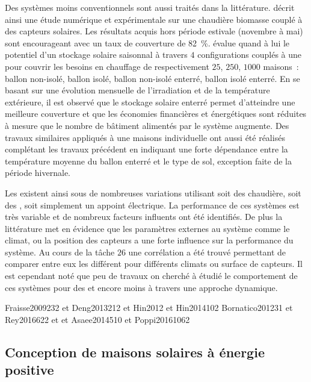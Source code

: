 Des systèmes moins conventionnels sont aussi traités dans la littérature.
\textcite{Hartl2012623} décrit ainsi une étude numérique et expérimentale sur une
chaudière biomasse couplé à des capteurs solaires. Les résultats acquis hors période estivale
(novembre à mai) sont encourageant avec un taux de couverture de \SI{82}{\percent}.
\textcite{Ucar20082532} évalue quand à lui le potentiel d’un stockage solaire saisonnal à travers $4$
configurations couplés à une  pour couvrir les besoins en
chauffage de respectivement $25$, $250$, $1000$ maisons~: ballon non-isolé, ballon isolé, ballon
non-isolé enterré, ballon isolé enterré. En se basant sur une évolution mensuelle de
l’irradiation et de la température extérieure, il est observé que le stockage solaire
enterré permet d’atteindre une meilleure couverture et que les économies financières et
énergétiques sont réduites à mesure que le nombre de bâtiment alimentés par le système augmente.
Des travaux similaires appliqués à une maisons individuelle ont aussi
été réalisés \parencite{Yumrutas2012983} complétant les travaux précédent en
indiquant une forte dépendance entre la température moyenne du ballon enterré et
le type de sol, exception faite de la période hivernale.

Les  existent ainsi sous de nombreuses variations utilisant soit des chaudière,
soit des , soit simplement un appoint électrique. La performance de ces
systèmes est très variable et de nombreux facteurs influents ont été identifiés. De plus
la littérature met en évidence que les paramètres externes au système comme le climat,
ou la position des capteurs a une forte influence sur la performance du système. Au cours
de la tâche $26$ une corrélation a été trouvé permettant de comparer entre eux les
différent  pour différents climats ou surface de capteurs. Il est cependant noté que
peu de travaux on cherché à étudié le comportement de ces systèmes pour des 
et encore moins à travers une approche dynamique.


Fraisse2009232 et Deng2013212 et Hin2012 et Hin2014102
Bornatico201231 et Rey2016622 et et Asaee2014510 et Poppi20161062



\subsection{Conception de maisons solaires à énergie positive} %
\label{sub:conception_de_maisons_solaires_a_energie_positive}
